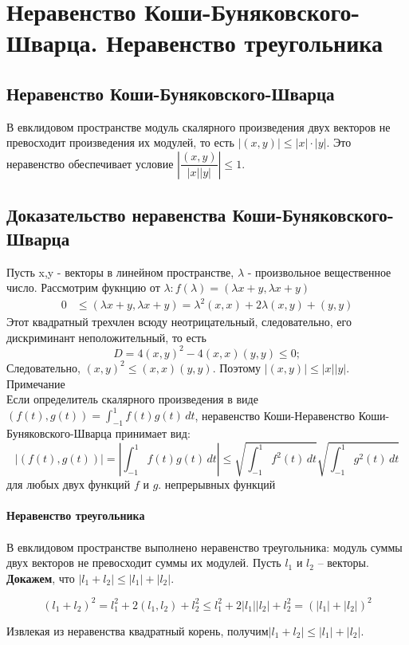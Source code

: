 \documentclass[12pt]{article}
\begin{document}
\section{Неравенство Коши-Буняковского-Шварца. Неравенство треугольника}
\subsection{Неравенство Коши-Буняковского-Шварца}
В евклидовом пространстве модуль скалярного произведения двух векторов не превосходит произведения их модулей, то есть  $|(x,y)| \leq |x| \cdot |y|$.  Это неравенство обеспечивает условие $\left|\dfrac{(x,y)}{|x||y|}\right| \leq 1$.

\subsection{Доказательство неравенства Коши-Буняковского-Шварца}
Пусть x,y - векторы в линейном пространстве, $\lambda$  - произвольное вещественное число. Рассмотрим фукнцию от $\lambda: f(\lambda)=(\lambda x+y,\lambda x+y)$
\begin{align*}
    0 & \leq (\lambda x + y, \lambda x + y)= \lambda^2 (x,x) + 2\lambda (x,y) + (y,y)
\end{align*}
Этот квадратный трехчлен всюду неотрицательный, следовательно, его дискриминант неположительный, то есть
$$D=4(x,y)^2-4(x,x)(y,y)\leq0;$$
Следовательно, $(x,y)^2\leq(x,x)(y,y)$.
Поэтому $|(x,y)| \leq |x||y|$.\\
Примечание \\
Если определитель скалярного произведения в виде $(f(t),g(t))=\int_{-1}^{1} f(t)g(t) \,dt$, неравенство Коши-Неравенство Коши-Буняковского-Шварца принимает вид:
$$|(f(t),g(t))|=|\int_{-1}^{1} f(t)g(t)\,dt| \leq \sqrt{\int_{-1}^{1} f^2(t)\,dt} \sqrt{\int_{-1}^{1} g^2(t)\,dt}$$
для любых двух функций $f$ и $g$. непрерывных функций\\
\\
\textbf{Неравенство треугольника}\\
\\
В евклидовом пространстве выполнено неравенство треугольника: модуль суммы двух векторов не
превосходит суммы их модулей.
Пусть $l_1$ и $l_2$ – векторы.\\
\textbf{Докажем}, что $|l_1 + l_2| \leq |l_1|+|l_2|$.

$$(l_1+l_2)^2=l_1^2+2(l_1,l_2)+l_2^2 \leq l_1^2+2|l_1||l_2|+l_2^2=(|l_1|+|l_2|)^2$$

Извлекая из неравенства квадратный корень, получим$|l_1+l_2|\leq|l_1|+|l_2|$.
\end{document}
